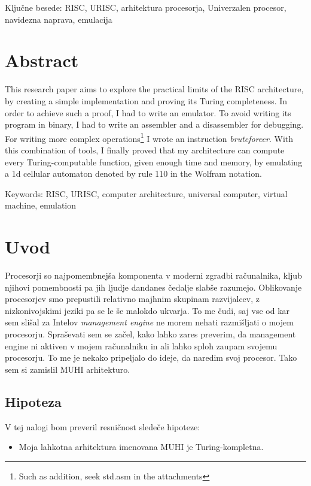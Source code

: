\documentclass[12pt]{article}
\begin{document}
Ključne besede: RISC, URISC, arhitektura procesorja, Univerzalen procesor, navidezna naprava, emulacija

\section{Abstract}
This research paper aims to explore the practical limits of the RISC architecture, by creating a simple implementation and proving its Turing completeness.
In order to achieve such a proof, I had to write an emulator.
To avoid writing its program in binary, I had to write an assembler and a disassembler for debugging.
For writing more complex operations\footnote{Such as addition, seek std.asm in the attachments} I wrote an instruction \textit{bruteforcer}.
With this combination of tools, I finally proved that my architecture can compute every Turing-computable function, given enough time and memory, by emulating a 1d cellular automaton denoted by rule 110 in the Wolfram notation.

Keywords: RISC, URISC, computer architecture, universal computer, virtual machine, emulation

\pagebreak

\section{Uvod}
Procesorji so najpomembnejša komponenta v moderni zgradbi računalnika, kljub njihovi pomembnosti pa jih ljudje dandanes čedalje slabše razumejo.
Oblikovanje procesorjev smo prepustili relativno majhnim skupinam razvijalcev, z nizkonivojskimi jeziki pa se le še malokdo ukvarja.
To me čudi, saj vse od kar sem slišal za Intelov \textit{management engine} ne morem nehati razmišljati o mojem procesorju.
Spraševati sem se začel, kako lahko zares preverim, da management engine ni aktiven v mojem računalniku in ali lahko sploh zaupam svojemu procesorju.
To me je nekako pripeljalo do ideje, da naredim svoj procesor.
Tako sem si zamislil MUHI arhitekturo.

\subsection{Hipoteza}
V tej nalogi bom preveril resničnost sledeče hipoteze:
\begin{itemize}
  \item Moja lahkotna arhitektura imenovana MUHI je Turing-kompletna.
\end{itemize}
\end{document}
